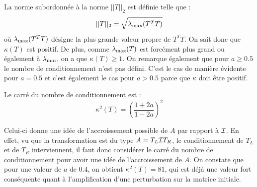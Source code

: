 La norme subordonnée à la norme $||T||_2$ est définie telle que :
$$||T||_2 = \sqrt{\lambda_\mathrm{max}(T^TT)}$$
où $\lambda_\mathrm{max}(T^TT)$ désigne la plus grande valeur propre de $T^TT$.
On sait donc que $\kappa(T) $ est positif.
De plus, comme $\lambda_\mathrm{max}(T)$ est forcément plus grand ou également à $\lambda_\mathrm{min}$, on a que $\kappa(T) \geq 1$.
On remarque également que pour $a \geq 0.5$ le nombre de conditionnement n'est pas défini.
C'est le cas de manière évidente pour $a = 0.5$ et c'est également le cas pour $a > 0.5$ parce que $\kappa$ doit être positif.

Le carré du nombre de conditionnement est :
\begin{equation} \label{equatkappa}
	\kappa^2 (T) = \left(\frac{1+2a}{1-2a}\right)^2
\end{equation}

Celui-ci donne une idée de l'accroissement possible de $A$ par rapport à $\mathcal{I}$.
En effet, vu que la transformation est du type $A = T_L \mathcal{I} T_R$,
le conditionnement de $T_L$ et de $T_R$ interviennent,
il faut donc considérer le carré du nombre de conditionnement pour avoir une idée de l'accroissement de $A$. On constate que pour une valeur de $a$ de $0.4$, on obtient $\kappa^2 (T) = 81$, qui est déjà une valeur fort conséquente quant à l'amplification d'une perturbation sur la matrice initiale.
